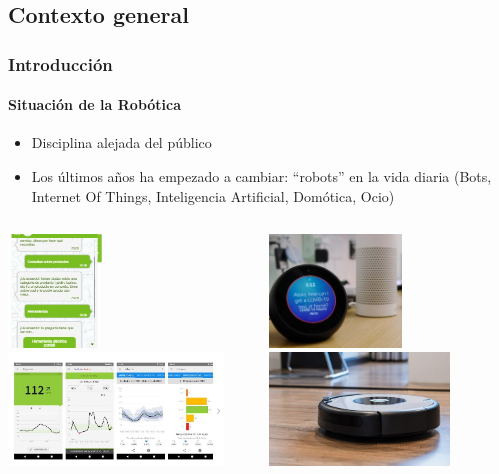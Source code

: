 \documentclass{beamer}
\begin{document}
\subsection{Contexto general}
\begin{frame}
\frametitle{Introducción}
\framesubtitle{Situación de la Robótica}

	\begin{itemize}	
		\item Disciplina alejada del público
		\item Los últimos años ha empezado a cambiar: ``robots'' en la vida diaria (Bots, Internet Of Things, Inteligencia Artificial, Domótica, Ocio)
	\end{itemize}
\begin{columns}
	
	\begin{column}{0.5\textwidth}
		\centering
		\includegraphics[height=3cm]{chatbot.jpg}
		\includegraphics[height=3cm]{IOT3.jpeg}
	\end{column}
	\begin{column}{0.5\textwidth}
		\centering
		\includegraphics[height=3cm]{alexa.jpg}
		\includegraphics[height=3cm]{domotica1.jpg}
	\end{column}


\end{columns}
\end{frame}
\end{document}
